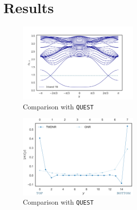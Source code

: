 
\section{Results}
\label{sec:resul}

\begin{figure}[H]
  \centering
  \includegraphics[width=6cm]{images/freeBands.png}
  \caption{Comparison with \texttt{QUEST}}
  \label{fig:blade_flow_pressure}
\end{figure}

\begin{figure}[H]
  \centering
  \includegraphics[width=6cm]{images/magProf.png}
  \caption{Comparison with \texttt{QUEST}}
  \label{fig:blade_flow_pressure}
\end{figure}

